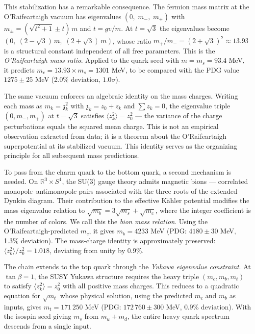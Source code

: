 \documentclass[12pt,a4paper]{article}
\begin{document}
This stabilization has a remarkable consequence. The fermion mass matrix
at the O'Raifeartaigh vacuum has eigenvalues $(0,\; m_-,\; m_+)$ with
$m_\pm = (\sqrt{t^2 + 1} \pm t)\,m$ and $t = gv/m$. At $t = \sqrt{3}$
the eigenvalues become $(0,\; (2-\sqrt{3})\,m,\; (2+\sqrt{3})\,m)$,
whose ratio $m_+/m_- = (2+\sqrt{3})^2 \approx 13.93$ is a structural
constant independent of all free parameters. This is the
\emph{O'Raifeartaigh mass ratio}. Applied to the quark seed with
$m = m_s = 93.4$ MeV, it predicts $m_c = 13.93 \times m_s = 1301$ MeV,
to be compared with the PDG value $1275 \pm 25$ MeV (2.0\% deviation,
$1.0\sigma$).

The same vacuum enforces an algebraic identity on the mass charges.
Writing each mass as $m_k = \mathfrak{z}_k^2$ with
$\mathfrak{z}_k = z_0 + z_k$ and $\sum z_k = 0$, the eigenvalue
triple $(0, m_-, m_+)$ at $t = \sqrt{3}$ satisfies
$\langle z_k^2 \rangle = z_0^2$ --- the variance of the charge
perturbations equals the squared mean charge. This is not an empirical
observation extracted from data; it is a theorem about the
O'Raifeartaigh superpotential at its stabilized vacuum. This identity
serves as the organizing principle for all subsequent mass predictions.

To pass from the charm quark to the bottom quark, a second mechanism is
needed. On $\mathbb{R}^3 \times S^1$, the SU(3) gauge theory admits
magnetic bions --- correlated monopole--antimonopole pairs associated
with the three roots of the extended Dynkin diagram. Their contribution
to the effective K\"ahler potential modifies the mass eigenvalue relation
to $\sqrt{m_b} = 3\sqrt{m_s} + \sqrt{m_c}$, where the integer
coefficient is the number of colors. We call this the \emph{bion mass
relation}. Using the O'Raifeartaigh-predicted $m_c$, it gives
$m_b = 4233$ MeV (PDG: $4180 \pm 30$ MeV, 1.3\% deviation). The
mass-charge identity is approximately preserved:
$\langle z_k^2 \rangle / z_0^2 = 1.018$, deviating from unity by 0.9\%.

The chain extends to the top quark through the \emph{Yukawa eigenvalue
constraint}. At $\tan\beta = 1$, the SUSY Yukawa structure requires the
heavy triple $(m_c, m_b, m_t)$ to satisfy $\langle z_k^2 \rangle = z_0^2$
with all positive mass charges. This reduces to a quadratic equation for $\sqrt{m_t}$
whose physical solution, using the predicted $m_c$ and $m_b$ as inputs,
gives $m_t = 171\,250$ MeV (PDG: $172\,760 \pm 300$ MeV, 0.9\%
deviation). With the isospin seed giving $m_s$ from $m_u + m_d$,
the entire heavy quark spectrum descends from a single input.
\end{document}
